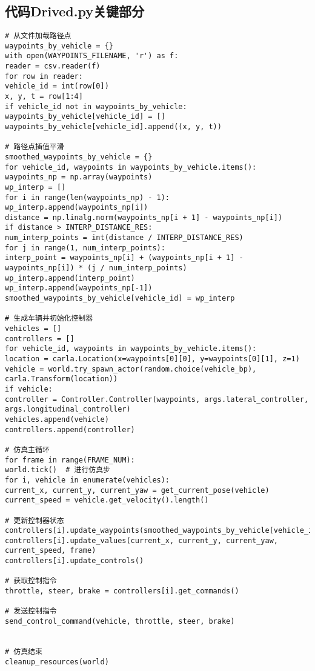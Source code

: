 \chapter{}

\section{代码Drived.py关键部分}
\begin{lstlisting}
# 从文件加载路径点
waypoints_by_vehicle = {}
with open(WAYPOINTS_FILENAME, 'r') as f:
reader = csv.reader(f)
for row in reader:
vehicle_id = int(row[0])
x, y, t = row[1:4]
if vehicle_id not in waypoints_by_vehicle:
waypoints_by_vehicle[vehicle_id] = []
waypoints_by_vehicle[vehicle_id].append((x, y, t))

# 路径点插值平滑
smoothed_waypoints_by_vehicle = {}
for vehicle_id, waypoints in waypoints_by_vehicle.items():
waypoints_np = np.array(waypoints)
wp_interp = []
for i in range(len(waypoints_np) - 1):
wp_interp.append(waypoints_np[i])
distance = np.linalg.norm(waypoints_np[i + 1] - waypoints_np[i])
if distance > INTERP_DISTANCE_RES:
num_interp_points = int(distance / INTERP_DISTANCE_RES)
for j in range(1, num_interp_points):
interp_point = waypoints_np[i] + (waypoints_np[i + 1] - waypoints_np[i]) * (j / num_interp_points)
wp_interp.append(interp_point)
wp_interp.append(waypoints_np[-1])
smoothed_waypoints_by_vehicle[vehicle_id] = wp_interp

# 生成车辆并初始化控制器
vehicles = []
controllers = []
for vehicle_id, waypoints in waypoints_by_vehicle.items():
location = carla.Location(x=waypoints[0][0], y=waypoints[0][1], z=1)
vehicle = world.try_spawn_actor(random.choice(vehicle_bp), carla.Transform(location))
if vehicle:
controller = Controller.Controller(waypoints, args.lateral_controller, args.longitudinal_controller)
vehicles.append(vehicle)
controllers.append(controller)

# 仿真主循环
for frame in range(FRAME_NUM):
world.tick()  # 进行仿真步
for i, vehicle in enumerate(vehicles):
current_x, current_y, current_yaw = get_current_pose(vehicle)
current_speed = vehicle.get_velocity().length()

# 更新控制器状态
controllers[i].update_waypoints(smoothed_waypoints_by_vehicle[vehicle_ids[i]])
controllers[i].update_values(current_x, current_y, current_yaw, current_speed, frame)
controllers[i].update_controls()

# 获取控制指令
throttle, steer, brake = controllers[i].get_commands()

# 发送控制指令
send_control_command(vehicle, throttle, steer, brake)


# 仿真结束
cleanup_resources(world)
\end{lstlisting}

